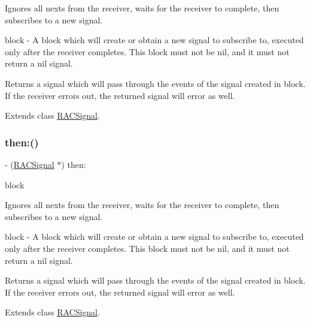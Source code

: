 Ignores all {\ttfamily next}s from the receiver, waits for the receiver to complete, then subscribes to a new signal.

block -\/ A block which will create or obtain a new signal to subscribe to, executed only after the receiver completes. This block must not be nil, and it must not return a nil signal.

Returns a signal which will pass through the events of the signal created in {\ttfamily block}. If the receiver errors out, the returned signal will error as well. 

Extends class \mbox{\hyperlink{interface_r_a_c_signal_aeed35de5a36e70f87721a0ad6ffabecd}{R\+A\+C\+Signal}}.

\mbox{\label{category_r_a_c_signal_07_operations_08_aeed35de5a36e70f87721a0ad6ffabecd}} 
\subsubsection{\texorpdfstring{then\+:()}{then:()}\hspace{0.1cm}{\footnotesize\ttfamily [3/3]}}
{\footnotesize\ttfamily -\/ (\mbox{\hyperlink{interface_r_a_c_signal}{R\+A\+C\+Signal}} $\ast$) then\+: \begin{DoxyParamCaption}\item[{(\mbox{\hyperlink{interface_r_a_c_signal}{R\+A\+C\+Signal}} $\ast$($^\wedge$)(void))}]{block }\end{DoxyParamCaption}}

Ignores all {\ttfamily next}s from the receiver, waits for the receiver to complete, then subscribes to a new signal.

block -\/ A block which will create or obtain a new signal to subscribe to, executed only after the receiver completes. This block must not be nil, and it must not return a nil signal.

Returns a signal which will pass through the events of the signal created in {\ttfamily block}. If the receiver errors out, the returned signal will error as well. 

Extends class \mbox{\hyperlink{interface_r_a_c_signal_aeed35de5a36e70f87721a0ad6ffabecd}{R\+A\+C\+Signal}}.

\mbox{\label{category_r_a_c_signal_07_operations_08_a2542ae804d05ec734d0f4d2fa8c3ac93}} 
